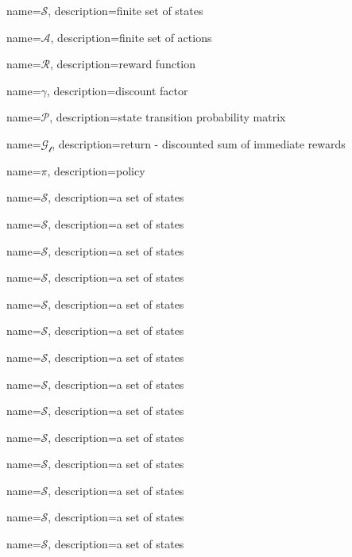 { 
	name={$\mathcal{S}$},
	description={finite set of states}
}

{ 
	name={$\mathcal{A}$},
	description={finite set of actions}
}

{ 
	name={$\mathcal{R}$},
	description={reward function}
}

{ 
	name={$\gamma$},
	description={discount factor}
}

{ 
	name={$\mathcal{P}$},
	description={state transition probability matrix}
}

{ 
	name={$\mathcal{G_{t}}$},
	description={return - discounted sum of immediate rewards}
}

{ 
	name={$\pi$},
	description={policy}
}

{ 
	name={$\mathcal{S}$},
	description={a set of states}
}

{ 
	name={$\mathcal{S}$},
	description={a set of states}
}

{ 
	name={$\mathcal{S}$},
	description={a set of states}
}

{ 
	name={$\mathcal{S}$},
	description={a set of states}
}

{ 
	name={$\mathcal{S}$},
	description={a set of states}
}

{ 
	name={$\mathcal{S}$},
	description={a set of states}
}

{ 
	name={$\mathcal{S}$},
	description={a set of states}
}

{ 
	name={$\mathcal{S}$},
	description={a set of states}
}

{ 
	name={$\mathcal{S}$},
	description={a set of states}
}

{ 
	name={$\mathcal{S}$},
	description={a set of states}
}

{ 
	name={$\mathcal{S}$},
	description={a set of states}
}

{ 
	name={$\mathcal{S}$},
	description={a set of states}
}

{ 
	name={$\mathcal{S}$},
	description={a set of states}
}

{ 
	name={$\mathcal{S}$},
	description={a set of states}
}


